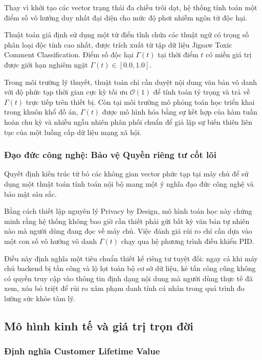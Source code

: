 Thay vì khởi tạo các vector trạng thái đa chiều trôi dạt, hệ thống tính toán một điểm số vô hướng duy nhất đại diện cho mức độ phơi nhiễm ngôn từ độc hại.

Thuật toán giả định sử dụng một từ điển tĩnh chứa các thuật ngữ có trọng số phân loại độc tính cao nhất, được trích xuất từ tập dữ liệu Jigsaw Toxic Comment Classification. Điểm số độc hại $\Gamma(t)$ tại thời điểm $t$ có miền giá trị được giới hạn nghiêm ngặt $\Gamma(t) \in [0.0, 1.0]$.

Trong môi trường lý thuyết, thuật toán chỉ cần duyệt nội dung văn bản vô danh với độ phức tạp thời gian cực kỳ tối ưu $\mathcal{O}(1)$ để tính toán tỷ trọng và trả về $\Gamma(t)$ trực tiếp trên thiết bị. Còn tại môi trường mô phỏng toán học triển khai trong khuôn khổ đồ án, $\Gamma(t)$ được mô hình hóa bằng sự kết hợp của hàm tuần hoàn chu kỳ và nhiễu ngẫu nhiên phân phối chuẩn để giả lập sự biến thiên liên tục của một luồng cấp dữ liệu mạng xã hội.
\subsubsection{Đạo đức công nghệ: Bảo vệ Quyền riêng tư cốt lõi}

Quyết định kiến trúc từ bỏ các không gian vector phức tạp tại máy chủ để sử dụng một thuật toán tính toán nội bộ mang một ý nghĩa đạo đức công nghệ và bảo mật sâu sắc.

Bằng cách thiết lập nguyên lý Privacy by Design, mô hình toán học này chứng minh rằng hệ thống không bao giờ cần thiết phải gửi bất kỳ văn bản tự nhiên nào mà người dùng đang đọc về máy chủ. Việc đánh giá rủi ro chỉ cần dựa vào một con số vô hướng vô danh $\Gamma(t)$ chạy qua hệ phương trình điều khiển PID. 

Điều này định nghĩa một tiêu chuẩn thiết kế riêng tư tuyệt đối: ngay cả khi máy chủ backend bị tấn công và lộ lọt toàn bộ cơ sở dữ liệu, kẻ tấn công cũng không có quyền truy cập vào thông tin định dạng nội dung mà người dùng thực tế đã xem, xóa bỏ triệt để rủi ro xâm phạm danh tính cá nhân trong quá trình đo lường sức khỏe tâm lý.

\subsection{Mô hình kinh tế và giá trị trọn đời}

\subsubsection{Định nghĩa Customer Lifetime Value}

